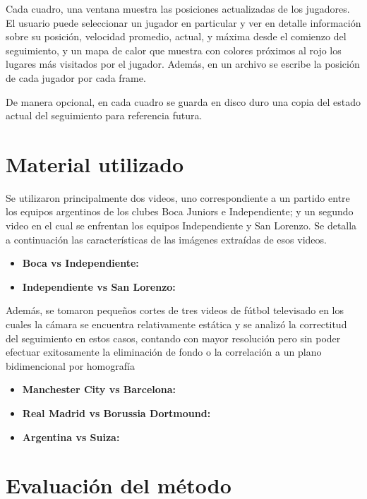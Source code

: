 Cada cuadro, una ventana muestra las posiciones actualizadas de los jugadores. El usuario puede seleccionar un jugador en particular y ver en detalle información sobre su posición, velocidad promedio, actual, y máxima desde el comienzo del seguimiento, y un mapa de calor que muestra con colores próximos al rojo los lugares más visitados por el jugador. Además, en un archivo se escribe la posición de cada jugador por cada frame.

De manera opcional, en cada cuadro se guarda en disco duro una copia del estado actual del seguimiento para referencia futura.

\section{Material utilizado}

Se utilizaron principalmente dos videos, uno correspondiente a un partido entre los equipos argentinos de los clubes Boca Juniors e Independiente; y un segundo video en el cual se enfrentan los equipos Independiente y San Lorenzo. Se detalla a continuación las características de las imágenes extraídas de esos videos.

\begin{itemize}
  \item \textbf{Boca vs Independiente:}
  \item \textbf{Independiente vs San Lorenzo:}
\end{itemize}

Además, se tomaron pequeños cortes de tres videos de fútbol televisado en los cuales la cámara se encuentra relativamente estática y se analizó la correctitud del seguimiento en estos casos, contando con mayor resolución pero sin poder efectuar exitosamente la eliminación de fondo o la correlación a un plano bidimencional por homografía %

\begin{itemize}
  \item \textbf{Manchester City vs Barcelona:}
  \item \textbf{Real Madrid vs Borussia Dortmound:}
  \item \textbf{Argentina vs Suiza:}
\end{itemize}

\section{Evaluación del método}

